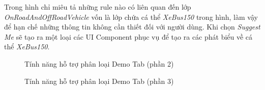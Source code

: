 Trong hình chỉ miêu tả những rule nào có liên quan đến lớp \textit{OnRoadAndOffRoadVehicle} vốn là lớp chứa cá thể \textit{XeBus150} trong hình, làm vậy để hạn chế những thông tin không cần thiết đối với người dùng. Khi chọn \textit{Suggest Me} sẽ tạo ra một loại các UI Component phục vụ để tạo ra các phát biểu về cá thể \textit{XeBus150}.
\begin{figure}[h!]
	\centering
	\caption{Tính năng hỗ trợ phân loại Demo Tab (phần 2)\label{overflow}}
\end{figure}
\begin{figure}[h!]
	\centering
	\caption{Tính năng hỗ trợ phân loại Demo Tab (phần 3)\label{overflow}}
\end{figure}

